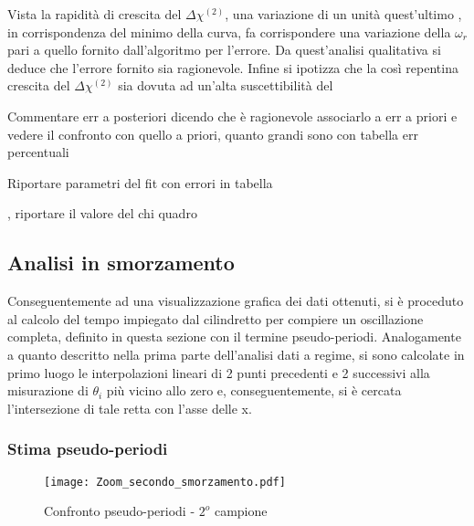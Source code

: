 \documentclass[a4paper,11pt,oneside]{article}
\begin{document}
Vista la rapidità di crescita del $\Delta\chi^{(2)}$, una variazione di un unità  quest'ultimo , in corrispondenza del minimo della curva, fa corrispondere una variazione della $\omega_{r}$ pari a quello fornito dall'algoritmo per l'errore.
Da quest'analisi qualitativa si deduce che l'errore fornito sia ragionevole.
Infine si ipotizza che la così repentina crescita del $\Delta \chi^{(2)}$ sia dovuta ad un'alta suscettibilità del



Commentare err a posteriori dicendo che è ragionevole associarlo a err a priori e vedere il confronto con quello a priori, quanto grandi sono con tabella err percentuali


Riportare parametri del fit con errori in tabella






, riportare il valore del chi quadro





\newpage

\subsection{Analisi in smorzamento}
Conseguentemente ad una visualizzazione grafica dei dati ottenuti, si è proceduto al calcolo del tempo impiegato dal cilindretto per compiere un oscillazione completa, definito in questa sezione con il termine pseudo-periodi.
Analogamente a quanto descritto nella prima parte dell'analisi dati a regime, si sono calcolate in primo luogo le interpolazioni lineari di 2 punti precedenti e 2 successivi alla misurazione di $\theta_i$ più vicino allo zero e, conseguentemente, si è cercata l'intersezione di tale retta con l'asse delle x.

\subsubsection{Stima pseudo-periodi}

\begin{wrapfigure}{r}{8cm}
    \centering
    \texttt{[image: Zoom\_secondo\_smorzamento.pdf]}
    \caption{Confronto pseudo-periodi - $2^o$ campione}
    \label{fig:zoom_secondo_smorzamento}
\end{wrapfigure}
\end{document}

